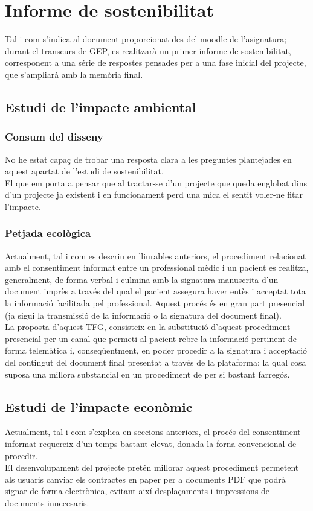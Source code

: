 \section{Informe de sostenibilitat}

Tal i com s'indica al document proporcionat des del moodle de l'asignatura; durant el transcurs de GEP, es realitzarà un primer informe de sostenibilitat, corresponent a una série de respostes pensades per a una fase inicial del projecte, que s'ampliarà amb la memòria final.

\subsection{Estudi de l'impacte ambiental}
\subsubsection{Consum del disseny}
No he estat capaç de trobar una resposta clara a les preguntes plantejades en aquest apartat de l'estudi de sostenibilitat.\\
El que em porta a pensar que al tractar-se d'un projecte que queda englobat dins d'un projecte ja existent i en funcionament perd una mica el sentit voler-ne fitar l'impacte.
\subsubsection{Petjada ecològica}
Actualment, tal i com es descriu en lliurables anteriors, el procediment relacionat amb el consentiment informat entre un professional mèdic i un pacient es realitza, generalment, de forma verbal i culmina amb la signatura manuscrita d'un document imprès a través del qual el pacient assegura haver entès i acceptat tota la informació facilitada pel professional.
Aquest procés és en gran part presencial (ja sigui la transmissió de la informació o la signatura del document final).\\
\newline La proposta d'aquest TFG, consisteix en la substitució d'aquest procediment presencial per un canal que permeti al pacient rebre la informació pertinent de forma telemàtica i, conseqüentment, en poder procedir a la signatura i acceptació del contingut del document final presentat a través de la plataforma; la qual cosa suposa una millora substancial en un procediment de per si bastant farregós.

\subsection{Estudi de l'impacte econòmic}
Actualment, tal i com s'explica en seccions anteriors, el procés del consentiment informat requereix d'un temps bastant elevat, donada la forna convencional de procedir.\\
El desenvolupament del projecte pretén millorar aquest procediment permetent als usuaris canviar els contractes en paper per a documents PDF que podrà signar de forma electrònica, evitant així desplaçaments i impressions de documents innecesaris.

